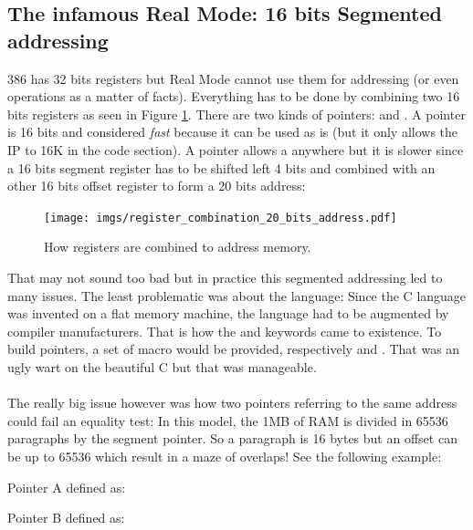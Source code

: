 \documentclass[book.tex]{subfiles}
\begin{document}
\subsection{The infamous Real Mode: 16 bits Segmented addressing}
386 has 32 bits registers but Real Mode cannot use them for addressing (or even operations as a matter of facts). Everything has to be done by combining two 16 bits registers as seen in Figure \ref{fig:register_comb_to_20_bits}. There are two kinds of pointers:  and . A  pointer is 16 bits and considered \emph{fast} because it can be used as is (but it only allows the IP to  16K in the code section). A  pointer allows a  anywhere but it is slower since a 16 bits segment register has to be shifted left 4 bits and combined with an other 16 bits offset register to form a 20 bits address:\\
\begin{figure}[H]
\centering
\texttt{[image: imgs/register\_combination\_20\_bits\_address.pdf]}
\caption{How registers are combined to address memory.}
\label{fig:register_comb_to_20_bits}
\end{figure}
That may not sound too bad but in practice this segmented addressing led to many issues. The least problematic was about the language: Since the C language was invented on a flat memory machine, the language had to be augmented by compiler manufacturers. That is how the  and  keywords came to existence. To build pointers, a set of macro would be provided, respectively  and . That was an ugly wart on the beautiful C but that was manageable.\\
\\
The really big issue however was how two pointers referring to the same address could fail an equality test: In this model, the 1MB of RAM is divided in 65536 paragraphs by the segment pointer. So a paragraph is 16 bytes but an offset can be up to 65536 which result in a maze of overlaps! See the following example:\\
\par
Pointer A defined as:\\
\par
\begin{minipage}{\textwidth}

\end{minipage}

\bigskip

Pointer B defined as:\\
\par
\begin{minipage}{\textwidth}

\end{minipage}
\end{document}
